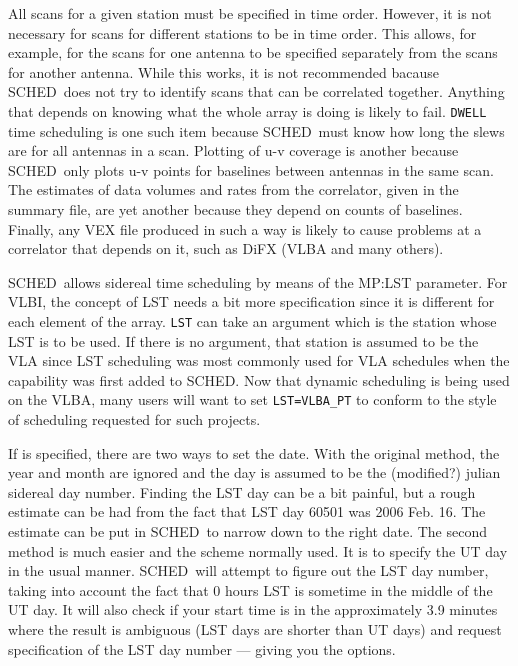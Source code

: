 \documentclass{report}
\newcommand{\sched}{{\sc SCHED}}
\newcommand{\schedb}{{\sc SCHED~}}
\begin{document}
All scans for a given station must be specified in time order.
However, it is not necessary for scans for different stations to be in
time order.  This allows, for example, for the scans for one antenna
to be specified separately from the scans for another antenna.  While
this works, it is not recommended bacause \schedb does not try to
identify scans that can be correlated together.  Anything that depends
on knowing what the whole array is doing is likely to fail.  {\tt DWELL}
time scheduling is one such item because \schedb must know how long
the slews are for all antennas in a scan.  Plotting of u-v coverage is
another because \schedb only plots u-v points for baselines between
antennas in the same scan.  The estimates of data volumes and rates
from the correlator, given in the summary file, are yet another
because they depend on counts of baselines.  Finally, any VEX file
produced in such a way is likely to cause problems at a correlator
that depends on it, such as DiFX (VLBA and many others).

\schedb allows sidereal time scheduling by means of the  {MP:LST} parameter.  For VLBI, the concept of LST needs a bit more
specification since it is different for each element of the array.
{\tt LST} can take an argument which is the station whose LST is to be
used.  If there is no argument, that station is assumed to be the VLA
since LST scheduling was most commonly used for VLA schedules when
the capability was first added to \sched.  Now that dynamic scheduling
is being used on the VLBA, many users will want to set
{\tt LST=VLBA\_PT} to conform to the style of scheduling requested
for such projects.

If  is specified, there are two ways to set
the date.  With the original method, the year and month are ignored
and the day is assumed to be the (modified?) julian sidereal day
number.  Finding the LST day can be a bit painful, but a rough
estimate can be had from the fact that LST day 60501 was 2006 Feb. 16.
The estimate can be put in \schedb to narrow down to the right date.
The second method is much easier and the scheme normally used.  It is
to specify the UT day in the usual manner.  \schedb will attempt to
figure out the LST day number, taking into account the fact that 0
hours LST is sometime in the middle of the UT day.  It will also check
if your start time is in the approximately 3.9 minutes where the
result is ambiguous (LST days are shorter than UT days) and request
specification of the LST day number --- giving you the options.
\end{document}
